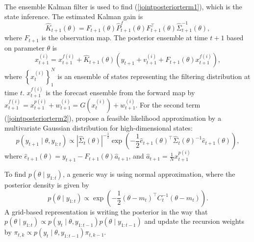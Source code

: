 The ensemble Kalman filter is used to find (\ref{jointposteriorterm1}), which is the state inference. The estimated Kalman gain is 
\begin{equation*}
\hat{K}_{t+1}(\theta) = F_{t+1}(\theta)\hat{P}_{t+1}^f(\theta)F_{t+1}^\top(\theta) \hat{\Sigma}_{t+1}^{-1}(\theta),
\end{equation*}
where $F_{t+1}$ is the observation map. The posterior ensemble at time $t+1$ based on parameter $\theta$ is
\begin{equation}\label{ensembleKalmanForecast}
x_{t+1}^{(i)} = x_{t+1}^{f(i)}+\hat{K}_{t+1}(\theta)\left(y_{t+1}+v_{t+1}^{(i)}+F_{t+1}(\theta)x_{t+1}^{f(i)}\right), 
\end{equation}
where $\left\lbrace x_{t}^{(i)}\right\rbrace_1^N$ is an ensemble of states representing the filtering distribution at time $t$. $x_{t+1}^{f(i)}$ is the forecast ensemble from the forward map by $x_{t+1}^{f(i)} = x_{t+1}^{p(i)} +w_{t+1}^{(i)}= G\left(x_{t}^{(i)}\right)+w_{t+1}^{(i)}$. For the second term (\ref{jointposteriorterm2}),  \cite{stroud2016bayesian} propose a feasible likelihood approximation by a multivariate Gaussian distribution \citep{mitchell2000adaptive} for high-dimensional states: 
\begin{equation}\label{esembleKalmanLikeli}
p(y_{t+1}\mid\theta,y_{1:t})\propto \left| \hat{\Sigma}_t(\theta)  \right|^{-\frac{1}{2}} \exp \left( -\frac{1}{2} \hat{e}_{t+1}(\theta)^\top \hat{\Sigma}_t(\theta)^{-1} \hat{e}_{t+1}(\theta) \right),
\end{equation}
where $\hat{e}_{t+1}(\theta) = y_{t+1}-F_{t+1}(\theta)\hat{a}_{t+1}$, and $\hat{a}_{t+1}=\frac{1}{N}x_{t+1}^{p(i)}$

To find $p(\theta\mid y_{1:t})$, a generic way is using normal approximation, where the posterior density  is given by 
\begin{equation*}
p(\theta\mid y_{1:t}) \propto \exp \left(  -\frac{1}{2}(\theta-m_t)^\top C_t^{-1}(\theta-m_t) \right).
\end{equation*}
A grid-based representation is writing the posterior in the way that $p(\theta\mid y_{1:t}) \propto p(y_t\mid\theta,y_{1:t-1})p(\theta\mid y_{1:t-1})$ and update the recursion weights by $\pi_{t,k}\propto p(y_{t}\mid\theta,y_{1:t-1})\pi_{t,k-1}$. 

